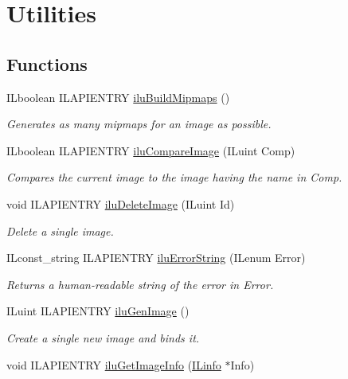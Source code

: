 \hypertarget{group__ilu__util}{\section{Utilities}
\label{group__ilu__util}
}
\subsection*{Functions}
\begin{DoxyCompactItemize}
\item 
I\+Lboolean I\+L\+A\+P\+I\+E\+N\+T\+R\+Y \hyperlink{group__ilu__util_ga7a8bbd9d1eae3c620a937b6cde501d38}{ilu\+Build\+Mipmaps} ()
\begin{DoxyCompactList}\small\item\em Generates as many mipmaps for an image as possible. \end{DoxyCompactList}\item 
I\+Lboolean I\+L\+A\+P\+I\+E\+N\+T\+R\+Y \hyperlink{group__ilu__util_gab39876b316fc278f23c3a62bb085eb48}{ilu\+Compare\+Image} (I\+Luint Comp)
\begin{DoxyCompactList}\small\item\em Compares the current image to the image having the name in Comp. \end{DoxyCompactList}\item 
void I\+L\+A\+P\+I\+E\+N\+T\+R\+Y \hyperlink{group__ilu__util_gaf642c38dac816854d145940b5b0183ff}{ilu\+Delete\+Image} (I\+Luint Id)
\begin{DoxyCompactList}\small\item\em Delete a single image. \end{DoxyCompactList}\item 
I\+Lconst\+\_\+string I\+L\+A\+P\+I\+E\+N\+T\+R\+Y \hyperlink{group__ilu__util_gaa899a04791dfb88d8b48c823998af427}{ilu\+Error\+String} (I\+Lenum Error)
\begin{DoxyCompactList}\small\item\em Returns a human-\/readable string of the error in {\itshape Error}. \end{DoxyCompactList}\item 
I\+Luint I\+L\+A\+P\+I\+E\+N\+T\+R\+Y \hyperlink{group__ilu__util_gadd57b10666d393a87fc264b46bcb6134}{ilu\+Gen\+Image} ()
\begin{DoxyCompactList}\small\item\em Create a single new image and binds it. \end{DoxyCompactList}\item 
\hypertarget{group__ilu__util_ga2dba9fc87a5d05e1401cd5fa08cd5728}{void I\+L\+A\+P\+I\+E\+N\+T\+R\+Y \hyperlink{group__ilu__util_ga2dba9fc87a5d05e1401cd5fa08cd5728}{ilu\+Get\+Image\+Info} (\hyperlink{struct_i_l_uinfo}{I\+Linfo} $\ast$Info)}\label{group__ilu__util_ga2dba9fc87a5d05e1401cd5fa08cd5728}


\end{DoxyCompactItemize}
